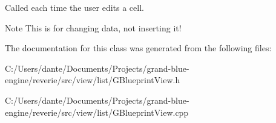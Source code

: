 Called each time the user edits a cell. 

\begin{DoxyNote}{Note}
This is for changing data, not inserting it! 
\end{DoxyNote}


The documentation for this class was generated from the following files\+:\begin{DoxyCompactItemize}
\item 
C\+:/\+Users/dante/\+Documents/\+Projects/grand-\/blue-\/engine/reverie/src/view/list/G\+Blueprint\+View.\+h\item 
C\+:/\+Users/dante/\+Documents/\+Projects/grand-\/blue-\/engine/reverie/src/view/list/G\+Blueprint\+View.\+cpp\end{DoxyCompactItemize}
